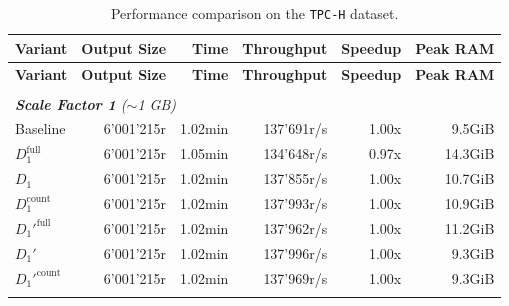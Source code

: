 \begin{longtable}{lrrrrr}
    
    \caption[TPC-H Performance Comparison]{Performance comparison on the \texttt{TPC-H} dataset.}
    \label{tab:results_ablation_tpc-h} \\

    \toprule
    \textbf{Variant}      & \textbf{Output Size}  & \textbf{Time}       & \textbf{Throughput}   & \textbf{Speedup}  & \textbf{Peak RAM} \\
    \midrule
    \endfirsthead 

    \toprule
    \textbf{Variant}      & \textbf{Output Size}  & \textbf{Time}       & \textbf{Throughput}   & \textbf{Speedup}  & \textbf{Peak RAM} \\
    \midrule
    \endhead 

    \bottomrule
    \endfoot  

    \endlastfoot 

    
    \multicolumn{6}{l}{\textit{4 Table Path Query}} \\
    \midrule
    \multicolumn{6}{l}{\textit{\textbf{Scale Factor 1} ($\sim$1 GB)}} \\
    \nopagebreak
    Baseline              &  6'001'215r           &  1.02min             &  137'691r/s          & 1.00x             & 9.5GiB    \\
    $D_1^{\text{full}}$   &  6'001'215r           &  1.05min             &  134'648r/s          & 0.97x             & 14.3GiB   \\
    \quad $D_1$           &  6'001'215r           &  1.02min             &  137'855r/s          & 1.00x             & 10.7GiB   \\
    $D_1^{\text{count}}$  &  6'001'215r           &  1.02min             &  137'993r/s          & 1.00x             & 10.9GiB   \\
    $D_1'^{\text{full}}$  &  6'001'215r           &  1.02min             &  137'962r/s          & 1.00x             & 11.2GiB   \\
    \quad $D_1'$          &  6'001'215r           &  1.02min             &  137'996r/s          & 1.00x             & 9.3GiB    \\
    $D_1'^{\text{count}}$ &  6'001'215r           &  1.02min             &  137'969r/s          & 1.00x             & 9.3GiB   \\
    \addlinespace
    

\end{longtable}
